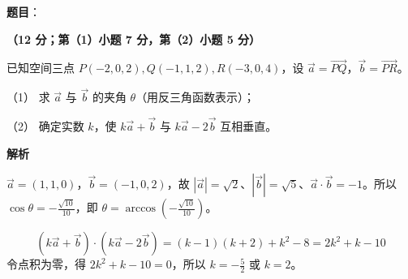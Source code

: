 \begin{answer}

\textbf{题目}：

\textbf{（12 分；第（1）小题 7 分，第（2）小题 5 分）}

已知空间三点 \(P(-2,0,2),Q(-1,1,2),R(-3,0,4)\)，设 \(\vec a=\overrightarrow{PQ}\)，\(\vec b=\overrightarrow{PR}\)。

（1） 求 \(\vec a\) 与 \(\vec b\) 的夹角 \(\theta\)（用反三角函数表示）；

（2） 确定实数 \(k\)，使 \(k\vec a+\vec b\) 与 \(k\vec a-2\vec b\) 互相垂直。

\textbf{解析}


\(\vec a=(1,1,0)\)，\(\vec b=(-1,0,2)\)，故 \(|\vec a|=\sqrt2\)、\(|\vec b|=\sqrt5\)、\(\vec a\cdot\vec b=-1\)。所以 \(\cos\theta=-\frac{\sqrt{10}}{10}\)，即 \(\theta=\arccos(-\frac{\sqrt{10}}{10})\)。


\nopagebreak[4]
\[
(k\vec a+\vec b)\cdot(k\vec a-2\vec b)=(k-1)(k+2)+k^2-8=2k^2+k-10
\]
令点积为零，得 \(2k^2+k-10=0\)，所以 \(k=-\frac52\) 或 \(k=2\)。



\end{answer}
